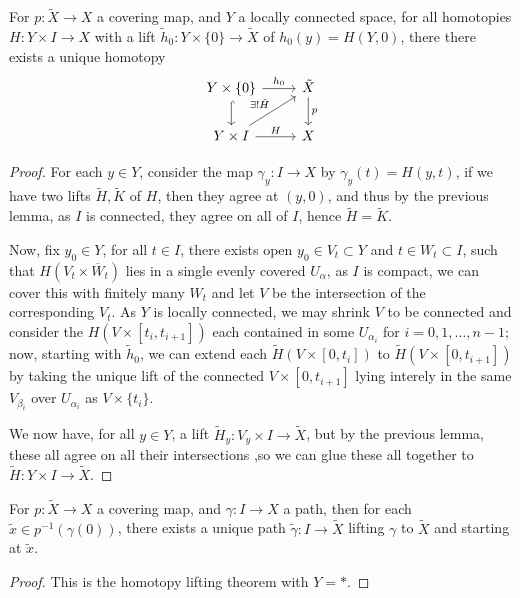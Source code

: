 \documentclass{article}
\begin{document}
\begin{theorem}
    For $p:\tilde{X}\rightarrow X$ a covering map, and $Y$ a locally connected space, for all homotopies $H:Y\times I \rightarrow X$ with a lift $\tilde{h}_0:Y\times\{0\}\rightarrow\tilde{X}$ of $h_0(y) = H(Y,0)$, there there exists a unique homotopy \[
    \begin{tikzcd}
        Y\times\{0\} \arrow[r, "h_0"] \arrow[d, hook] & \tilde{X} \arrow[d, "p"] \\
        Y\times I \arrow[r, "H"] \arrow[ur, "\exists ! \tilde{H}"] & X
    \end{tikzcd}
    \]\begin{proof}
        For each $y\in Y$, consider the map $\gamma_y:I\rightarrow X$ by $\gamma_y(t) = H(y,t)$, if we have two lifts $\tilde{H},\tilde{K}$ of $H$, then they agree at $(y,0)$, and thus by the previous lemma, as $I$ is connected, they agree on all of $I$, hence $\tilde{H}=\tilde{K}$.

        Now, fix $y_0\in Y$, for all $t\in I$, there exists open $y_0\in V_t\subset Y$ and $t \in W_t\subset I$, such that $H(V_t\times \overline{W}_t)$ lies in a single evenly covered $U_\alpha$, as $I$ is compact, we can cover this with finitely many $W_t$ and let $V$ be the intersection of the corresponding $V_t$. As $Y$ is locally connected, we may shrink $V$ to be connected and consider the $H(V\times[t_i,t_{i+1}])$ each contained in some $U_{\alpha_i}$ for $i = 0,1,\ldots,n-1$; now, starting with $\tilde{h}_0$, we can extend each $\tilde{H}(V\times[0,t_i])$ to $\tilde{H}(V\times [0,t_{i+1}])$ by taking the unique lift of the connected $V\times [0,t_{i+1}]$ lying interely in the same $V_{\beta_i}$ over $U_{\alpha_i}$ as $V\times \{t_i\}$.

        We now have, for all $y\in Y$, a lift $\tilde{H}_y:V_y\times I\rightarrow \tilde{X}$, but by the previous lemma, these all agree on all their intersections ,so we can glue these all together to $\tilde{H}:Y\times I \rightarrow \tilde{X}$.
    \end{proof}
\end{theorem}

\begin{corollary}
    For $p:\tilde{X}\rightarrow X$ a covering map, and $\gamma:I\rightarrow X$ a path, then for each $\tilde{x}\in p^{-1}(\gamma(0))$, there exists a unique path $\tilde{\gamma}:I\rightarrow \tilde{X}$ lifting $\gamma$ to $\tilde{X}$ and starting at $\tilde{x}$.
    \begin{proof}
        This is the homotopy lifting theorem with $Y = *$.
    \end{proof}
\end{corollary}
\end{document}
